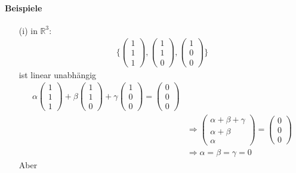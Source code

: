 \documentclass[11pt]{report}
\newcommand*\Zb[1] {\mathbb{#1}}
\begin{document}
\paragraph{Beispiele}
\begin{itemize}
 \item[(i)] in $\Zb{R}^3$:
\begin{align}
 \{ \begin{pmatrix} 1 \\ 1 \\ 1 \end{pmatrix}, \begin{pmatrix} 1 \\ 1 \\ 0 \end{pmatrix}, \begin{pmatrix} 1 \\ 0 \\ 0 \end{pmatrix}\}
\end{align}
ist linear unabhängig
\begin{align}
 \alpha \begin{pmatrix} 1 \\ 1 \\ 1 \end{pmatrix} + \beta \begin{pmatrix} 1 \\ 1 \\ 0 \end{pmatrix} + \gamma \begin{pmatrix} 1 \\ 0 \\ 0 \end{pmatrix} = \begin{pmatrix} 0 \\ 0 \\ 0 \end{pmatrix} \\
&\Rightarrow \begin{pmatrix} \alpha + \beta + \gamma \\ \alpha+ \beta \\ \alpha \end{pmatrix} = \begin{pmatrix} 0 \\ 0 \\ 0 \end{pmatrix} \\
&\Rightarrow \alpha = \beta = \gamma = 0
\end{align}
Aber 
\begin{align}

\end{align}
\end{itemize}
\end{document}
